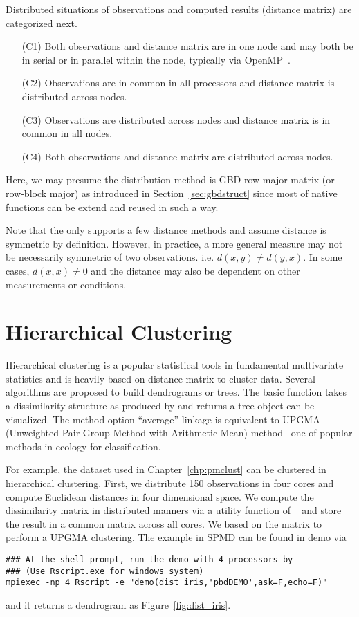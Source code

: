 Distributed situations of observations and computed results (distance
matrix) are categorized next.
\begin{itemize}
\item[(C1)]
      Both observations and distance matrix are in one node and may both be
      in serial or in parallel within the node, typically via
      OpenMP~\citep{OpenMP}.
\item[(C2)]
      Observations are in common in all processors
      and distance matrix is distributed across nodes.
\item[(C3)]
      Observations are distributed across nodes
      and distance matrix is in common in all nodes.
\item[(C4)]
      Both observations and distance matrix are distributed
      across nodes.
\end{itemize}
Here, we may presume the distribution method is GBD row-major matrix (or
row-block major) as introduced in Section~\ref{sec:gbdstruct} since most of
native  functions can be extend and reused in such a way.

Note that the  only supports a few distance methods and assume
distance is symmetric by definition. However,
in practice, a more general measure may not be necessarily
symmetric of two observations. i.e. $d(x, y) \neq d(y, x)$.
In some cases, $d(x, x) \neq 0$ and the distance may also be dependent
on other measurements or conditions.


\section{Hierarchical Clustering}

Hierarchical clustering is a popular statistical tools in fundamental
multivariate statistics and is heavily based on distance matrix to cluster
data. Several algorithms are proposed to build dendrograms or trees.
The basic function 
takes a dissimilarity structure as
produced by  and returns a tree object can be visualized.
The method option ``average'' linkage is equivalent to
UPGMA (Unweighted Pair Group Method with Arithmetic Mean)
method~\citep{Sokal1985} one of popular methods in ecology for classification.

For example, the  dataset used in Chapter~\ref{chp:pmclust} can be
clustered in hierarchical clustering. First, we distribute 150 observations
in four cores and compute Euclidean distances in four dimensional space.
We compute the dissimilarity matrix in distributed manners via a
utility function 
of ~\citep{Chen2012pbdMPIpackage}
and store the result in a common matrix across all cores. We based on
the matrix to perform a UPGMA clustering. The example in SPMD can be
found in demo via
\begin{lstlisting}
### At the shell prompt, run the demo with 4 processors by
### (Use Rscript.exe for windows system)
mpiexec -np 4 Rscript -e "demo(dist_iris,'pbdDEMO',ask=F,echo=F)"
\end{lstlisting}
and it returns a dendrogram as Figure~\ref{fig:dist_iris}.

